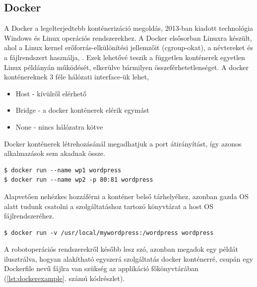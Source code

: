 \subsection{Docker}
A Docker a legelterjedtebb konténerizáció megoldás, 2013-ban kiadott technológia Windows és Linux operációs rendszerekhez. A Docker elsősorban Linuxra készült, ahol a Linux kernel erőforrás-elkülönítési jellemzőit (cgroup-okat), a névtereket és a fájlrendszert használja, . Ezek lehetővé teszik a független konténerek egyetlen Linux példányán működését, elkerülve bármilyen összeférhetetlenséget.
A docker konténereknek 3 féle hálózati interface-ük lehet,
\begin{itemize}
	\item Host - kívülről elérhető
	\item Bridge - a docker konténerek elérik egymást
	\item None - nincs hálózatra kötve
\end{itemize}
Docker konténerek létrehozásánál megadhatjuk a port átirányítást, így azonos alkalmazások sem akadnak össze.
\begin{minipage}{\linewidth}
\begin{lstlisting}[caption={Példa két WordPress szolgáltatás párhuzamos indítására a 80 és 81-es portokon}]
$ docker run --name wp1 wordpress
$ docker run --name wp2 -p 80:81 wordpress
\end{lstlisting}
\end{minipage}
Alapvetően nehézkes hozzáférni a konténer belső tárhelyéhez, azonban gazda OS alatt tudunk csatolni a szolgáltatáshoz tartozó könyvtárat a host OS fájlrendszeréhez.
\begin{lstlisting}[caption={Példa volume csatolásához}]
$ docker run -v /usr/local/mywordpress:/wordpress wordpress
\end{lstlisting}
A robotoperációs rendszerekről később lesz szó, azonban megadok egy példát ilusztrálva, hogyan alakítható egyszerá szolgáltatás docker konténerré, csupán egy Dockerfile nevű fájlra van szükség az applikáció főkönyvtárában (\ref{lst:dockerexample}. számú kódrészlet).

